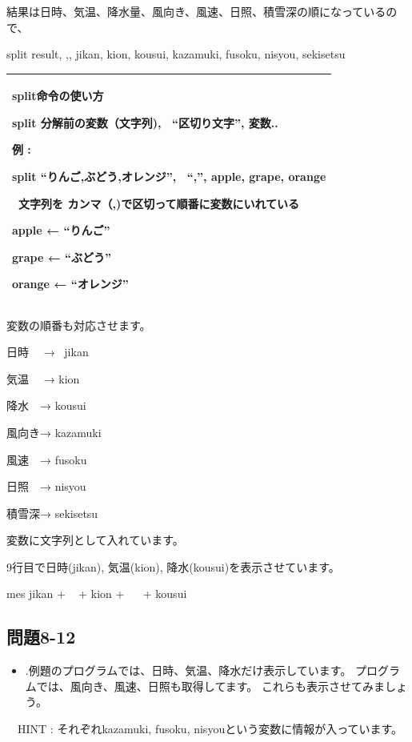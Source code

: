 \documentclass[a4paper,12pt,dvipdfmx]{jarticle}
\begin{document}
結果は日時、気温、降水量、風向き、風速、日照、積雪深の順になっているので、

split result, {\textquotedbl},{\textquotedbl}, jikan, kion, kousui, kazamuki, fusoku, nisyou, sekisetsu


\bigskip

\begin{center}
\tablefirsthead{}
\tablehead{}
\tabletail{}
\tablelasttail{}
\begin{supertabular}{|m{16.806cm}|}
\hline
split命令の使い方

split 分解前の変数（文字列), \ “区切り文字”,
変数..

例 : 

split “りんご,ぶどう,オレンジ”, \ “,”, apple, grape, orange

\ 文字列を
カンマ（,)で区切って順番に変数にいれている

apple ← “りんご”

grape ← “ぶどう”

orange ← “オレンジ”\\\hline
\end{supertabular}
\end{center}

\bigskip


\bigskip

変数の順番も対応させます。

日時 　→ \ jikan

気温　 → kion 　

降水　→ kousui 

風向き→ kazamuki

風速　→ fusoku

日照　→ nisyou

積雪深→ sekisetsu

変数に文字列として入れています。


\bigskip

9行目で日時(jikan), 気温(kion),
降水(kousui)を表示させています。

mes jikan + {\textquotedbl} \ {\textquotedbl} + kion + {\textquotedbl} \ \ {\textquotedbl} + kousui

\clearpage\subsection*{問題8-12}
\begin{itemize}
\item
.例題のプログラムでは、日時、気温、降水だけ表示しています。
		プログラムでは、風向き、風速、日照も取得してます。
		これらも表示させてみましょう。
\end{itemize}
\ \ HINT : それぞれkazamuki, fusoku,
nisyouという変数に情報が入っています。
\end{document}
